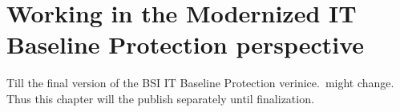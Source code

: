 \chapter{Working in the Modernized IT Baseline Protection perspective}\label{chap:baseline-protection}

Till the final version of the BSI IT Baseline Protection verinice.\ might
change. Thus this chapter will the publish separately until finalization.
